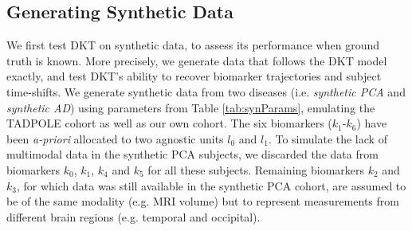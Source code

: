 \documentclass{llncs}
\DeclareMathOperator*{\argmin}{arg\,min}
\begin{document}



\subsection{Generating Synthetic Data}
\label{sec:dktMetSyn}

We first test DKT on synthetic data, to assess its performance when ground truth is known. More precisely, we generate data that follows the DKT model exactly, and test DKT's ability to recover biomarker trajectories and subject time-shifts. We generate synthetic data from two diseases (i.e. \emph{synthetic PCA} and \emph{synthetic AD}) using parameters from Table \ref{tab:synParams}, emulating the TADPOLE cohort as well as our own cohort. The six biomarkers ($k_1$-$k_6$) have been \emph{a-priori} allocated to two agnostic units $l_0$ and $l_1$. To simulate the lack of multimodal data in the synthetic PCA subjects, we discarded the data from biomarkers $k_0$, $k_1$, $k_4$ and $k_5$ for all these subjects. Remaining biomarkers $k_2$ and $k_3$, for which data was still available in the synthetic PCA cohort, are assumed to be of the same modality (e.g. MRI volume) but to represent measurements from different brain regions (e.g. temporal and occipital). 
 
\end{document}
